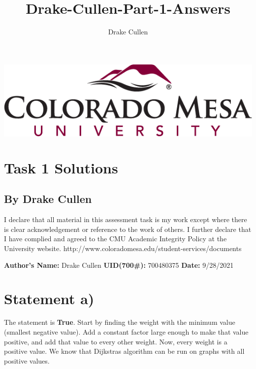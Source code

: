 \documentclass[11pt]{article}
\title{Drake-Cullen-Part-1-Answers}
\author{Drake Cullen}
\begin{document}
\begin{minipage}{\linewidth}%
\centering
\includegraphics[keepaspectratio=true,scale=0.35]{CMU.png}
\end{minipage}
\section*{ \centering Task 1 Solutions}
\subsection*{ \centering By Drake Cullen} 

\vspace{5mm}
 
I declare that all material in this assessment task is my work except where there is clear acknowledgement or reference to the work of others. I further declare that I have complied and agreed to the CMU Academic Integrity Policy at the University website. http://www.coloradomesa.edu/student-services/documents
\begin{center}
\textbf{Author’s Name:} Drake Cullen 
\textbf{UID(700\#):} 700480375
\textbf{ Date:} 9/28/2021
\end{center} 

\section{Statement a)}
The statement is \textbf{True}. Start by finding the weight with the minimum value (smallest negative value). Add a constant factor large enough to make that value positive, and add that value to every other weight. Now, every weight is a positive value. We know that Dijkstras algorithm can be run on graphs with all positive values.
\end{document}
